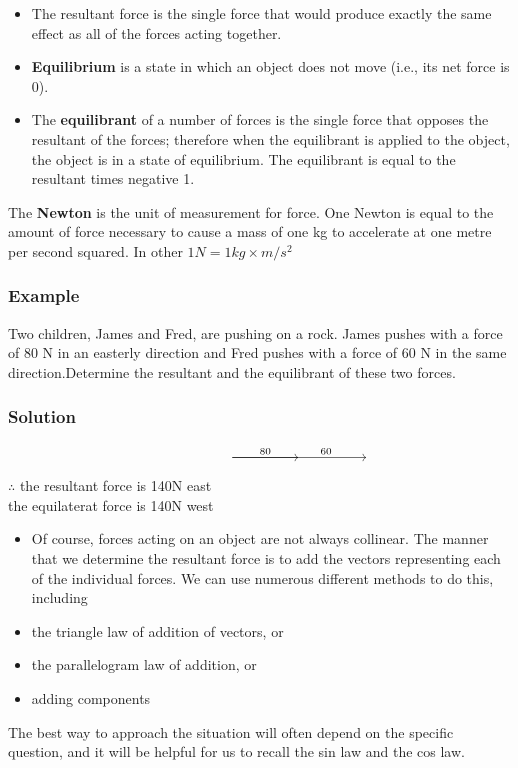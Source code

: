 \documentclass{article}
\begin{document}
\begin{itemize}
    \item The resultant force is the single force that would produce exactly the        same effect as all of the forces acting together.
    \item \textbf{Equilibrium} is a state in which an object does not move (i.e., its net force is 0).
    \item The \textbf{equilibrant} of a number of forces is the single force that opposes the resultant of the forces; therefore when the equilibrant is applied to the object, the object is in a state of equilibrium.  The equilibrant is equal to the resultant times negative 1.
\end{itemize}
The \textbf{Newton} is the unit of measurement for force.  One Newton is equal to the amount of force necessary to cause a mass of one kg to accelerate at one metre per second squared.  In other $1N=1kg \times m/s^2$

\subsubsection*{Example}
Two children, James and Fred, are pushing on a rock. James pushes with a force of 80 N in an easterly direction and Fred pushes with a force of 60 N in the same direction.Determine the resultant and the equilibrant of these two forces.
\subsubsection*{Solution}
\[\begin{tikzcd}
	{} && {} &&&& {}
	\arrow[""{name=0, anchor=center, inner sep=0}, "60"{pos=0.7}, from=1-3, to=1-7]
	\arrow["80", from=1-3, to=0]
\end{tikzcd}\]
$\therefore$ the resultant force is 140N east\\
the equilaterat force is 140N west

\begin{itemize}
    \item Of course, forces acting on an object are not always collinear.  The manner that we determine the resultant force is to add the vectors representing each of the individual forces.  We can use numerous different methods to do this, including
    \item the triangle law of addition of vectors, or
    \item the parallelogram law of addition, or
    \item adding components
\end{itemize}
 The best way to approach the situation will often depend on the specific question, and it will be helpful for us to recall the sin law and the cos law.
 
\end{document}
